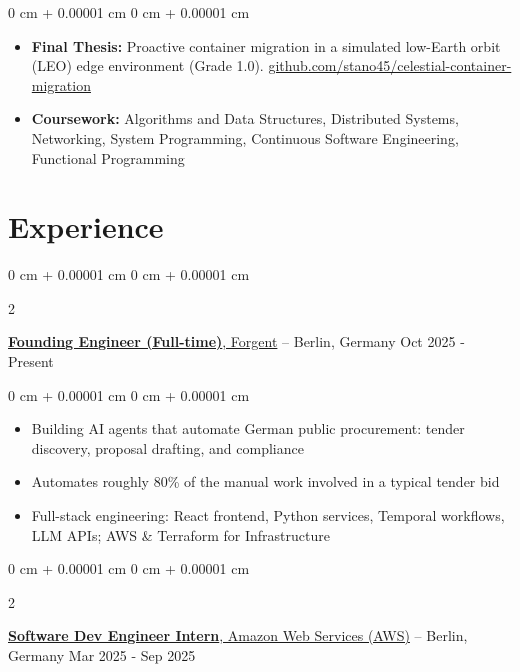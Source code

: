 \documentclass[10pt, letterpaper]{article}
\newenvironment{highlights}{
    \begin{itemize}[
        topsep=0.10 cm,
        parsep=0.10 cm,
        partopsep=0pt,
        itemsep=0pt,
        leftmargin=0 cm + 10pt
    ]
}{
    \end{itemize}
} %
\newenvironment{onecolentry}{
    \begin{adjustwidth}{
        0 cm + 0.00001 cm
    }{
        0 cm + 0.00001 cm
    }
}{
    \end{adjustwidth}
} %
\newenvironment{twocolentry}[2][]{
    \onecolentry
    \def\secondColumn{#2}
    \setcolumnwidth{\fill, 4.5 cm}
    \begin{paracol}{2}
}{
    \switchcolumn \raggedleft \secondColumn
    \end{paracol}
    \endonecolentry
} %
\begin{document}
        \vspace{0.10 cm}
        \begin{onecolentry}
            \begin{highlights}
                \item \textbf{Final Thesis:} Proactive container migration in a simulated low-Earth orbit (LEO) edge environment (Grade 1.0). \href{https://github.com/stano45/celestial-container-migration}{github.com/stano45/celestial-container-migration}
                \item \textbf{Coursework:} Algorithms and Data Structures, Distributed Systems, Networking, System Programming, Continuous Software Engineering, Functional Programming
            \end{highlights}
        \end{onecolentry}

    \section{Experience}

        \begin{twocolentry}{
            Oct 2025 - Present
        }
            \href{https://www.forgent.ai}{\textbf{Founding Engineer (Full-time)}, Forgent} -- Berlin, Germany\end{twocolentry}

        \vspace{0.10 cm}
        \begin{onecolentry}
            \begin{highlights}
                \item Building AI agents that automate German public procurement: tender discovery, proposal drafting, and compliance
                \item Automates roughly 80\% of the manual work involved in a typical tender bid
                \item Full-stack engineering: React frontend, Python services, Temporal workflows, LLM APIs; AWS \& Terraform for Infrastructure
            \end{highlights}
        \end{onecolentry}

        \vspace{0.2 cm}

        \begin{twocolentry}{
            Mar 2025 - Sep 2025
        }
            \href{https://aws.amazon.com}{\textbf{Software Dev Engineer Intern}, Amazon Web Services (AWS)} -- Berlin, Germany\end{twocolentry}
\end{document}
